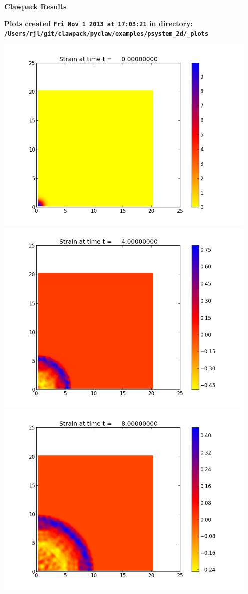 \documentclass[11pt]{article}
\begin{document}
        \begin{center}{\Large\bf Clawpack Results}\vskip 5pt
        
        \bf Plots created {\tt Fri Nov  1 2013 at 17:03:21} in directory: \vskip 5pt
        \verb+/Users/rjl/git/clawpack/pyclaw/examples/psystem_2d/_plots+
        \end{center}
        \vskip 5pt
        \includegraphics[width=0.95\textwidth]{frame0000fig0.png}
\vskip 10pt 
\includegraphics[width=0.95\textwidth]{frame0001fig0.png}
\vskip 10pt 
\includegraphics[width=0.95\textwidth]{frame0002fig0.png}
\end{document}
